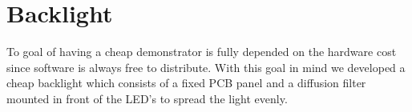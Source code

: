 \newpage
\section{Backlight}
To goal of having a cheap demonstrator is fully depended on the hardware cost since software is always free to distribute. With this goal in mind we developed a cheap backlight which consists of a fixed PCB panel and a diffusion filter mounted in front of the LED's to spread the light evenly. 
